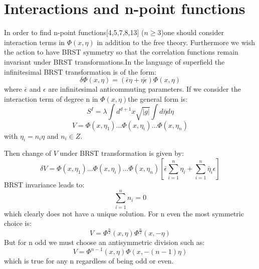 \documentclass[a4paper,12pt]{article}
\begin{document}
  \section{Interactions and n-point functions}
 In order to find n-point functions[4,5,7,8,13] ($n\geq 3$)one should consider
 interaction terms in $\Phi(x,\eta)$ in addition to the free
 theory. Furthermore we wish the action to have BRST symmetry so that
 the correlation functions remain invariant under BRST
 transformations.In the language of superfield the
 infinitesimal BRST transformation is of the form:
 \begin{equation}\label{eq:a12}
 \delta\Phi(x,\eta)=(\bar{\epsilon}\eta+\bar{\eta\epsilon})\Phi(x,\eta)
 \end{equation}
 where $\bar{\epsilon}$ and $\epsilon$ are infinitesimal anticommuting
 parameters.
 If we consider the interaction term of degree n in
 $\Phi(x,\eta)$the general form is:
\begin{equation}
S^{I}=\lambda\int d^{d+1}x\sqrt{|g|}\int d\bar{\eta}d\eta
\end{equation}
\begin{equation}
V=\Phi(x,\eta_{1})...\Phi(x,\eta_{i})...\Phi(x,\eta_{n})
\end{equation}
with $\eta_{i}=n_{i}\eta$ and $n_{i}\in Z$.

 Then change of $V$ under BRST transformation is given by:
  \begin{equation}
 \delta V =\Phi(x,\eta_{1})...\Phi(x,\eta_{i})...\Phi(x,\eta_{n})[\bar{\epsilon}\sum_{i=1}^{n}\eta_{i}+\sum_{i=1}^{n}\bar{\eta}_{i}\epsilon]
 \end{equation}
 BRST invariance leads to:
 \begin{equation}
 \sum_{i=1}^{n}n_{i}=0
 \end{equation}
 which clearly does not have a unique solution.
 For n even the most symmetric choice is:
 \begin{equation}\label{eq:a18}
  V=\Phi^\frac{n}{2}(x,\eta)\Phi^\frac{n}{2}(x,-\eta)
  \end{equation}
 But for n odd we must choose an antisymmetric division such as:
\begin{equation}
V=\Phi^{n-1}(x,\eta)\Phi(x,-(n-1)\eta)\label{eq:a19}
\end{equation} which is
true for any n regardless of being odd or even.
\end{document}
